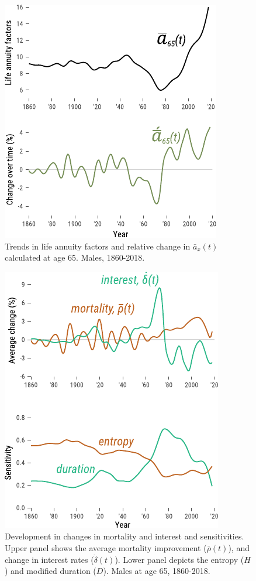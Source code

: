 \documentclass[12pt]{article}
\begin{document}
 \begin{figure}[!ht]
	\centering
	\includegraphics[width=0.5\linewidth]{Fig/axm}
	\caption{{Trends in life annuity factors and relative change in $\bar{a}_x(t)$ calculated at age 65. Males, 1860-2018.}}
	\label{fig:Fig2}
\end{figure}

\begin{figure}[!ht]
	\centering
	\includegraphics[width=0.5\linewidth]{Fig/IntMort}
	\caption{{Development in changes in mortality and interest and sensitivities. Upper panel shows the average mortality improvement ($\bar{\rho}(t)$), and change in interest rates ($\dot{\delta}(t)$). Lower panel depicts the entropy ($H$) and modified duration ($D$). Males at age 65, 1860-2018.}}
	\label{fig:Fig3}
\end{figure}
\end{document}

